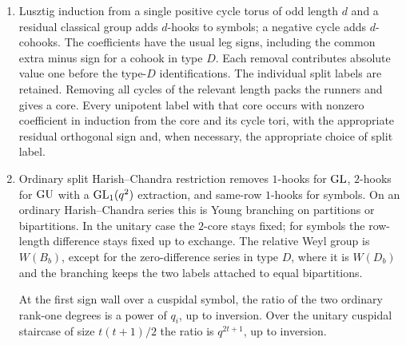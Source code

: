 \begin{proposition}
\begin{enumerate}
A hook is a bead $a$ and a smaller gap $b$ in the same row; a cohook
uses a gap in the other row.  Their lengths are $a-b>0$.
For a packet with field parameter $q_i$, its degree defect at the
odd prime $p$ is the product of
$(q_i^h-1)_p$ over hooks and $(q_i^c+1)_p$ over cohooks.
The inherited central torus contribution must also be included.
For an original regular group this is its full connected center;
for a residual factor $\mathbf R$, it is the torus $\mathbf T_R$
of Lemma~\ref{fam:regular-datum}.  The product over packets,
including a toral $D_1$ packet, multiplied by $|\mathbf T_R^F|_p$,
is the degree defect of the ordinary Jordan correspondent.
Thus the toral packet is counted exactly once.
\item Lusztig induction from a single positive cycle torus of odd length
$d$ and a residual classical group adds $d$-hooks to symbols;
a negative cycle adds $d$-cohooks.  The coefficients have the usual
leg signs, including the common extra minus sign for a cohook
in type $D$.  Each removal contributes absolute value one before the
type-$D$ identifications.  The individual split labels are retained.
Removing all cycles of the relevant length packs the runners and
gives a core.  Every unipotent label with that core occurs with
nonzero coefficient in induction from the core and its cycle tori,
with the appropriate residual orthogonal sign and, when necessary,
the appropriate choice of split label.
\item Ordinary split Harish--Chandra restriction removes $1$-hooks
for $\operatorname{GL}$, $2$-hooks for $\operatorname{GU}$ with a
$\operatorname{GL}_1(q^2)$ extraction, and same-row $1$-hooks for symbols.
On an ordinary Harish--Chandra series this is Young branching on
partitions or bipartitions.  In the unitary case the $2$-core stays
fixed; for symbols the row-length difference stays fixed up to
exchange.  The relative Weyl group is $W(B_b)$, except for the
zero-difference series in type $D$, where it is $W(D_b)$ and the
branching keeps the two labels attached to equal bipartitions.

At the first sign wall over a cuspidal symbol, the ratio of the two
ordinary rank-one degrees is a power of $q_i$, up to inversion.
Over the unitary cuspidal staircase of size $t(t+1)/2$ the ratio is
$q^{2t+1}$, up to inversion.
\end{enumerate}
\end{proposition}


